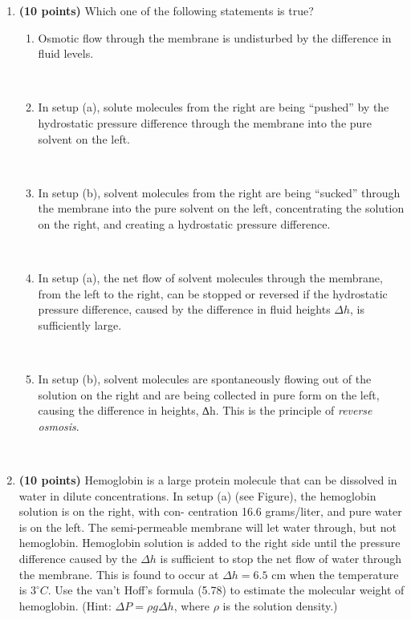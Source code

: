 \documentclass[fleqn]{article}
\begin{document}
  \begin{enumerate}
    \item \textbf{(10 points)} Which one of the following statements is true?
      \begin{enumerate}
        \item Osmotic flow through the membrane is undisturbed by the difference in fluid levels.

          \textcolor{hwColor}{
            \\
          }


        \item In setup (a), solute molecules from the right are being “pushed” by the hydrostatic pressure
        difference through the membrane into the pure solvent on the left.

          \textcolor{hwColor}{
            \\
          }

        \item In setup (b), solvent molecules from the right are being “sucked” through the membrane
        into the pure solvent on the left, concentrating the solution on the right, and creating a
        hydrostatic pressure difference.

          \textcolor{hwColor}{
            \\
          }

        \item  In setup (a), the net flow of solvent molecules through the membrane, from the left to
        the right, can be stopped or reversed if the hydrostatic pressure difference, caused by the
        difference in fluid heights $\Delta h$, is sufficiently large.

          \textcolor{hwColor}{
            \\
          }

        \item In setup (b), solvent molecules are spontaneously flowing out of the solution on the right
        and are being collected in pure form on the left, causing the difference in heights, ∆h. This
        is the principle of \emph{reverse osmosis}.

          \textcolor{hwColor}{
            \\
          }

      \end{enumerate}

    \item \textbf{(10 points)} Hemoglobin is a large protein molecule that can be dissolved in water in dilute
    concentrations. In setup (a) (see Figure), the hemoglobin solution is on the right, with con-
    centration 16.6 grams/liter, and pure water is on the left. The semi-permeable membrane will
    let water through, but not hemoglobin. Hemoglobin solution is added to the right side until
    the pressure difference caused by the $\Delta h$ is sufficient to stop the net flow of water through the
    membrane. This is found to occur at $\Delta h = 6.5$ cm when the temperature is $3^{\circ} C$.
    Use the van't Hoff's formula (5.78) to estimate the molecular weight of hemoglobin. (Hint:
    $\Delta P= \rho g \Delta h$, where $\rho$ is the solution density.)


\end{enumerate}
\end{document}

